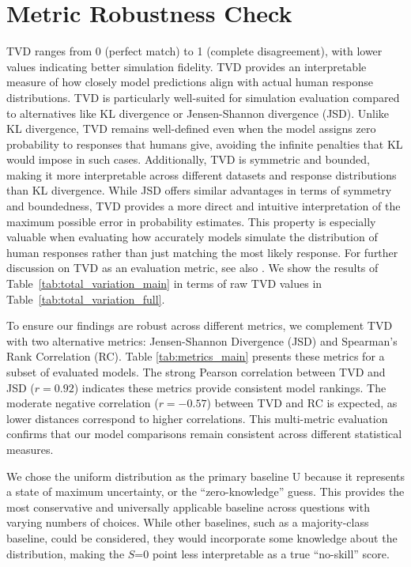 \documentclass{article} %
\begin{document}
\section{Metric Robustness Check}
\label{metric_robustness}
TVD ranges from 0 (perfect match) to 1 (complete disagreement), with lower values indicating better simulation fidelity. TVD provides an interpretable measure of how closely model predictions align with actual human response distributions. TVD is particularly well-suited for simulation evaluation compared to alternatives like KL divergence or Jensen-Shannon divergence (JSD). Unlike KL divergence, TVD remains well-defined even when the model assigns zero probability to responses that humans give, avoiding the infinite penalties that KL would impose in such cases. Additionally, TVD is symmetric and bounded, making it more interpretable across different datasets and response distributions than KL divergence. While JSD offers similar advantages in terms of symmetry and boundedness, TVD provides a more direct and intuitive interpretation of the maximum possible error in probability estimates. This property is especially valuable when evaluating how accurately models simulate the distribution of human responses rather than just matching the most likely response. For further discussion on TVD as an evaluation metric, see also \cite{meister-etal-2025-benchmarking}. We show the results of Table~\ref{tab:total_variation_main} in terms of raw TVD values in Table~\ref{tab:total_variation_full}. 

To ensure our findings are robust across different metrics, we complement TVD with two alternative metrics: Jensen-Shannon Divergence (JSD) and Spearman's Rank Correlation (RC). Table \ref{tab:metrics_main} presents these metrics for a subset of evaluated models. The strong Pearson correlation between TVD and JSD ($r = 0.92$) indicates these metrics provide consistent model rankings. The moderate negative correlation ($r = -0.57$) between TVD and RC is expected, as lower distances correspond to higher correlations. This multi-metric evaluation confirms that our model comparisons remain consistent across different statistical measures.

We chose the uniform distribution as the primary baseline U because it represents a state of maximum uncertainty, or the ``zero-knowledge'' guess. This provides the most conservative and universally applicable baseline across questions with varying numbers of choices. While other baselines, such as a majority-class baseline, could be considered, they would incorporate some knowledge about the distribution, making the $S$=0 point less interpretable as a true ``no-skill'' score.
\end{document}
